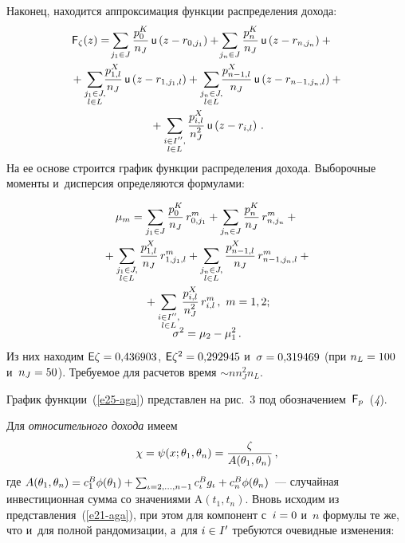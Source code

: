 \begin{multicols}{2}
  Наконец, находится аппроксимация функции распределения дохода: 
  \begin{multline}
  \hspace*{-8pt}{\sf F}_{\zeta}(z) =\!\sum\limits_{j_1\in J} \fr{p_0^K}{n_J}\,{\sf u} \left( z-
r_{0,j_1}\right) +\!\sum\limits_{j_n\in J} \fr{p_n^K}{n_J}\, {\sf u} \left( z-
r_{n,j_n}\right)+{}\\
  {}+ \sum\limits_{\substack{
  {j_1\in J,}\\
  {l\in L}}}\! \!\fr{p^X_{1,l}}{n_J}\, {\sf u}
  \left( z-
r_{1,j_1,l}\right) +\sum\limits_{\substack{{j_n\in J,}\\ {l\in L} }}\!\!
\fr{p^X_{n-1,l}}{n_J}\, {\sf u}\left( z-
r_{n-1, j_n,l}\right) +{}\\
{}+\sum\limits_{\substack{{i\in I^{\prime\prime},}\\ {l\in L}}} 
\fr{p^X_{i,l}}{n_J^2}\, {\sf u}\left( z-r_{i,l}\right)\,.
  \label{e25-aga}
  \end{multline}
  На ее основе строится график функции распределения дохода. Выборочные 
моменты и~дисперсия определяются формулами:

\noindent
  \begin{multline*}
  \mu_m=\sum\limits_{j_1\in J} \displaystyle\frac{\displaystyle p_0^K\mathstrut}{\displaystyle n_J\mathstrut} \,r^m_{0,j_1} 
+\sum\limits_{j_n\in J} \displaystyle\frac{\displaystyle p_n^K\mathstrut}{\displaystyle n_J\mathstrut}\,r^m_{n,j_n} +{}\\
{}+\sum\limits_{\substack{{j_1\in J,}\\ 
{l\in  L}}} \displaystyle\frac{\displaystyle p^X_{1,l}\mathstrut}{\displaystyle n_J\mathstrut} \, r^m_{1, j_1, l} +
\sum\limits_{\substack{{j_n\in J,}\\ {l\in L}}} 
\displaystyle\frac{\displaystyle p^X_{n-1,l}\mathstrut}{\displaystyle n_J\mathstrut}\,r^m_{n-1, j_n, l}+{}\\
  {}+ \sum\limits_{\substack{{i\in I^{\prime\prime},}\\ {l\in L}}} 
\displaystyle\frac{\displaystyle p^X_{i,l}\mathstrut}{\displaystyle n_J^2\mathstrut}\,r^m_{i,l}\,,\ m=1,2;\\[-6pt] 
\sigma^2=\mu_2-\mu_1^2\,.
  \end{multline*}
%      
  Из них находим ${\sf E}\zeta\hm=  0{,}436903$, ${\sf E}\zeta^2\hm = 
0{,}292945$ и~$\sigma \hm= 0{,}319469$ (при $n_L \hm= 100$ и~$n_J\hm= 50$). 
Требуемое для расчетов время $\sim  n n_J^2n_L$.
  
  График функции~(\ref{e25-aga}) представлен на рис.~3 под 
обозначением~${\sf F}_p$~(\textit{4}). 
  
  
  Для \textit{относительного дохода} имеем 
    $$
  \chi = \psi(x; \theta_1, \theta_n) 
= \displaystyle\frac{\displaystyle \zeta\mathstrut}{\displaystyle A(\theta_1,\theta_n)\mathstrut}\,,
$$
 где
  $A(\theta_1,\theta_n)\hm =c_1^B\phi (\theta_1)\hm+\sum\nolimits_{\iota=2,\ldots , n-1} c_\iota^B 
g_\iota\hm +c_n^B \phi(\theta_n)$~--- случайная инвестиционная сумма со значениями 
$\mathrm{A}(t_1, t_n)$. Вновь исходим из пред\-став\-ле\-ния~(\ref{e21-aga}), при этом для компонент с~$i 
\hm= 0$ и~$n$ формулы те же, что и~для полной рандомизации,  а~для $i\hm\in I^\prime$ требуются 
очевидные изменения:


\end{multicols}

